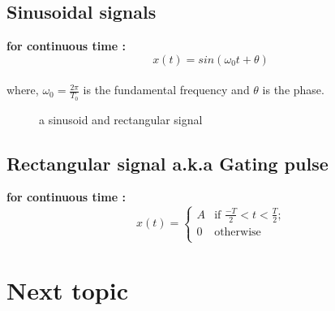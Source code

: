 \documentclass[a4paper,12pt]{book}
\begin{document}
\subsection*{Sinusoidal signals}
{\bf for continuous time :}\\
	 $$ x(t) = sin(\omega_0 t+ \theta)$$ \\
where, $\omega_0 = \frac{2\pi}{T_0}$ is the fundamental frequency and $\theta$ is the phase.\\
\begin{figure}[h]  
\centering 
{}
\caption{a sinusoid and rectangular signal} \label{fig:M}  
\end{figure}

\subsection*{ Rectangular signal a.k.a Gating pulse}
{\bf for continuous time :}\\
	\[ x(t) = \left\{ \begin{array}{ll}

	A & \mbox{if $\frac{-T}{2}< t <\frac{T}{2}$;} \\

	0 & \mbox{otherwise} \\
	\end{array}
	\right. \]
\bigskip














\pagebreak
\section{Next topic}
\begingroup
\centering
\end{document}
